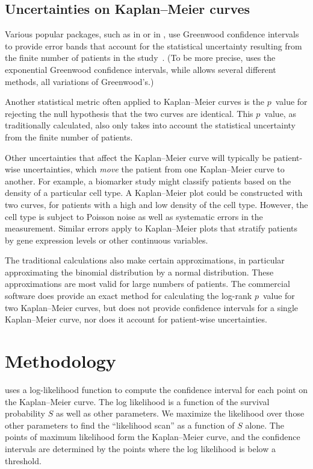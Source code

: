 \documentclass[article]{jss}
\newcommand{\KM}{Kaplan--Meier} %
\begin{document}
\subsection{Uncertainties on \KM{} curves}

Various popular packages, such as  \citep{survival-package} in  \citep{R} or  \citep{lifelines} in , use Greenwood confidence intervals to provide error bands that account for the statistical uncertainty resulting from the finite number of patients in the study~\citep{GreenwoodNotes,Greenwood}. (To be more precise,  uses the exponential Greenwood confidence intervals, while  allows several different methods, all variations of Greenwood's.)

Another statistical metric often applied to \KM{} curves is the \(p\)~value for rejecting the null hypothesis that the two curves are identical. This \(p\)~value, as traditionally calculated, also only takes into account the statistical uncertainty from the finite number of patients.

Other uncertainties that affect the \KM{} curve will typically be patient-wise uncertainties, which \emph{move} the patient from one \KM{} curve to another. For example, a biomarker study might classify patients based on the density of a particular cell type. A \KM{} plot could be constructed with two curves, for patients with a high and low density of the cell type. However, the cell type is subject to Poisson noise as well as systematic errors in the measurement. Similar errors apply to \KM{} plots that stratify patients by gene expression levels or other continuous variables.

The traditional calculations also make certain approximations, in particular approximating the binomial distribution by a normal distribution. These approximations are most valid for large numbers of patients. The commercial software  \citep{StatXact} does provide an exact method for calculating the log-rank \(p\)~value for two \KM{} curves, but does not provide confidence intervals for a single \KM{} curve, nor does it account for patient-wise uncertainties.

\section{Methodology}\label{sec:methodology}

 uses a log-likelihood function to compute the confidence interval for each point on the \KM{} curve. The log likelihood is a function of the survival probability \(S\) as well as other parameters. We maximize the likelihood over those other parameters to find the ``likelihood scan'' as a function of \(S\) alone. The points of maximum likelihood form the \KM{} curve, and the confidence intervals are determined by the points where the log likelihood is below a threshold.
\end{document}
